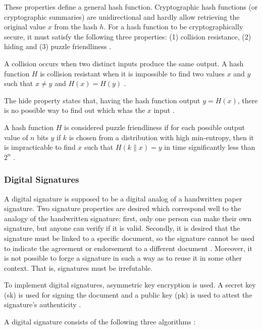 These properties define a general hash function. Cryptographic hash functions (or cryptographic summaries) are unidirectional and hardly allow retrieving the original value $x$ from the hash $h$. For a hash function to be cryptographically secure, it must satisfy the following three properties: (1) collision resistance, (2) hiding and (3) puzzle friendliness \cite{greve2018blockchain}.

A collision occurs when two distinct inputs produce the same output. A hash function $H$ is collision resistant when it is impossible to find two values $x$ and $y$ such that $x \neq y$ and $H(x) = H(y)$ \cite{narayanan2016bitcoin}.

The hide property states that, having the hash function output $y = H (x)$, there is no possible way to find out which whas the $x$ input \cite{greve2018blockchain}.

A hash function $H$ is considered puzzle friendliness if for each possible output value of $n$ bits $y$ if $k$ is chosen from a distribution with high min-entropy, then it is impracticable to find $x$ such that $H (k \| x) = y$ in time significantly less than $2^n$ \cite{narayanan2016bitcoin}.

\subsubsection{Digital Signatures}\label{sec:assinaturasDigitais}
A digital signature is supposed to be a digital analog of a handwritten paper signature. Two signature properties are desired which correspond well to the analogy of the handwritten signature: first, only one person can make their own signature, but anyone can verify if it is valid. Secondly, it is desired that the signature must be linked to a specific document, so the signature cannot be used to indicate the agreement or endorsement to a different document \cite{merkle1989certified}. Moreover, it is not possible to forge a signature in such a way as to reuse it in some other context. That is, signatures must be irrefutable.

To implement digital signatures, asymmetric key encryption is used. A secret key (sk) is used for signing the document and a public key (pk) is used to attest the signature's authenticity \cite{greve2018blockchain}.

A digital signature consists of the following three algorithms \cite{narayanan2016bitcoin}:

